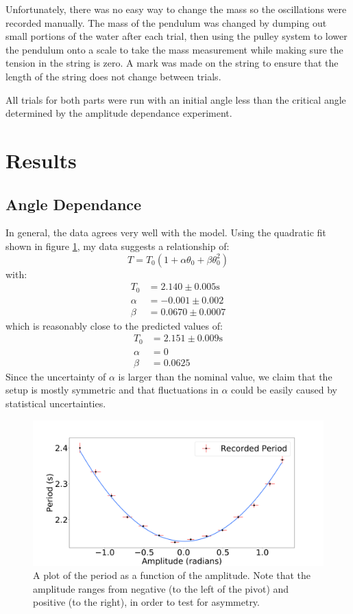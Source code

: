 \documentclass[%
 reprint,
 amsmath,amssymb
 aps,
]{revtex4-2}
\begin{document}
Unfortunately, there was no easy way to change the mass so the oscillations were recorded manually. The mass of the pendulum was changed by dumping out small portions of the water after each trial, then using the pulley system to lower the pendulum onto a scale to take the mass measurement while making sure the tension in the string is zero. A mark was made on the string to ensure that the length of the string does not change between trials.

All trials for both parts were run with an initial angle less than the critical angle determined by the amplitude dependance experiment.

\section{Results}
\subsection{Angle Dependance}
In general, the data agrees very well with the model. Using the quadratic fit shown in figure \ref{fig:period-vs-amplitude}, my data suggests a relationship of:
\begin{equation}
    T = T_0\left(1+\alpha \theta_0 +\beta\theta_0^2\right)
    \label{eq:}
\end{equation}
with:
\begin{align}
    T_0 &= 2.140 \pm 0.005 \si{\second} \\ 
    \alpha &= -0.001 \pm 0.002\\
    \beta &= 0.0670 \pm 0.0007
\end{align}
which is reasonably close to the predicted values of:
\begin{align}
    T_0 &= 2.151 \pm 0.009 \si{\second} \\ 
    \alpha &= 0 \\ 
    \beta &= 0.0625
    \label{eq:}
\end{align}
Since the uncertainty of $\alpha$ is larger than the nominal value, we claim that the setup is mostly symmetric and that fluctuations in $\alpha$ could be easily caused by statistical uncertainties.
\begin{figure}[!h]
    \includegraphics[width=\linewidth]{Figures/period-vs-amplitude.png}

    \caption{A plot of the period as a function of the amplitude. Note that the amplitude ranges from negative (to the left of the pivot) and positive (to the right), in order to test for asymmetry.}
    \label{fig:period-vs-amplitude}
\end{figure}
\end{document}
